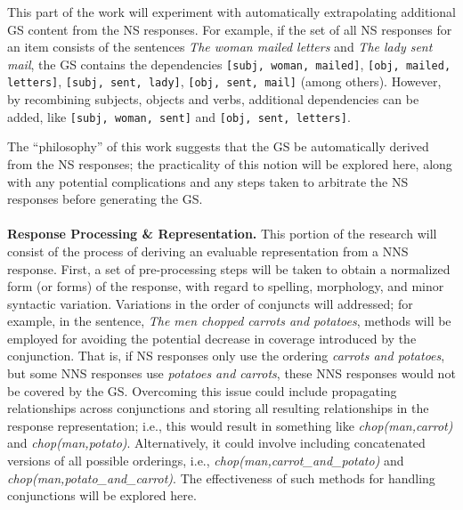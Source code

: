 \documentclass[11pt]{article}
\begin{document}
This part of the work will experiment with automatically extrapolating additional GS content from the NS responses. For example, if the set of all NS responses for an item consists of the sentences \textit{The woman mailed letters} and \textit{The lady sent mail}, the GS contains the dependencies \texttt{[subj, woman, mailed]}, \texttt{[obj, mailed, letters]}, \texttt{[subj, sent, lady]}, \texttt{[obj, sent, mail]} (among others). However, by recombining subjects, objects and verbs, additional dependencies can be added, like \texttt{[subj, woman, sent]} and \texttt{[obj, sent, letters]}.
\par
The ``philosophy'' of this work suggests that the GS be automatically derived from the NS responses; the practicality of this notion will be explored here, along with any potential complications and any steps taken to arbitrate the NS responses before generating the GS.\\
\\
\textbf{Response Processing \& Representation.} This portion of the research will consist of the process of deriving an evaluable representation from a NNS response. First, a set of pre-processing steps will be taken to obtain a normalized form (or forms) of the response, with regard to spelling, morphology, and minor syntactic variation. Variations in the order of conjuncts will addressed; for example, in the sentence, \textit{The men chopped carrots and potatoes}, methods will be employed for avoiding the potential decrease in coverage introduced by the conjunction. That is, if NS responses only use the ordering \textit{carrots and potatoes}, but some NNS responses use \textit{potatoes and carrots}, these NNS responses would not be covered by the GS. Overcoming this issue could include propagating relationships across conjunctions and storing all resulting relationships in the response representation; i.e., this would result in something like \textit{chop(man,carrot)} and \textit{chop(man,potato)}. Alternatively, it could involve including concatenated versions of all possible orderings, i.e., \textit{chop(man,carrot\_and\_potato)} and \textit{chop(man,potato\_and\_carrot)}. The effectiveness of such methods for handling conjunctions will be explored here.
\end{document}
